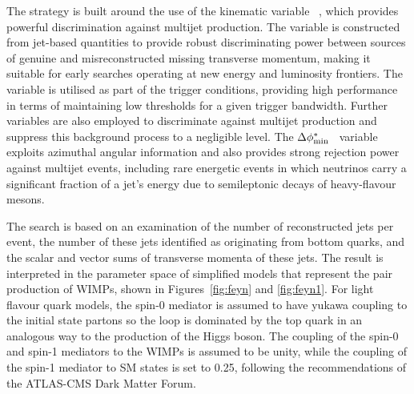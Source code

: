 The strategy is built around the use of the kinematic variable
\alphat~\cite{Randall:2008rw, RA1Paper}, which provides powerful
discrimination against multijet production. The \alphat variable is
constructed from jet-based quantities to provide robust discriminating
power between sources of genuine and misreconstructed missing
transverse momentum, making it suitable for early searches operating
at new energy and luminosity frontiers. The \alphat variable is
utilised as part of the trigger conditions, providing high performance
in terms of maintaining low thresholds for a given trigger
bandwidth. Further variables are also employed to discriminate against
multijet production and suppress this background process to a
negligible level. The $\Delta\phi^{*}_{\rm min}$~\cite{RA1Paper}
variable exploits azimuthal angular information and also provides
strong rejection power against multijet events, including rare
energetic events in which neutrinos carry a significant fraction of a
jet's energy due to semileptonic decays of heavy-flavour mesons.


The search is based on an examination of the number of reconstructed
jets per event, the number of these jets identified as originating
from bottom quarks, and the scalar and vector sums of transverse
momenta of these jets. 
The result is interpreted in the parameter space of simplified
models that represent the
pair production of WIMPs, shown in Figures~\ref{fig:feyn} and \ref{fig:feyn1}.
For light flavour quark models, the spin-0 mediator is assumed to have yukawa coupling to the initial state partons so the loop is dominated by the top quark in an analogous way to the production of the Higgs boson. The coupling of the spin-0 and spin-1 mediators to the WIMPs is assumed to be unity, while the coupling of the spin-1 mediator to SM states is set to 0.25, following the recommendations of the ATLAS-CMS Dark Matter Forum. 

